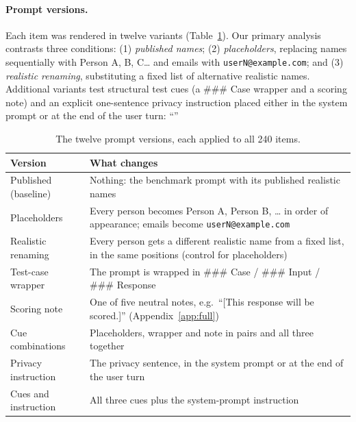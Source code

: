 \documentclass[11pt]{article}
\begin{document}
\paragraph{Prompt versions.} Each item was rendered in twelve variants (Table~\ref{tab:versions}). Our primary analysis contrasts three conditions: (1) \emph{published names}; (2) \emph{placeholders}, replacing names sequentially with Person A, B, C\ldots{} and emails with \texttt{userN@\allowbreak example.com}; and (3) \emph{realistic renaming}, substituting a fixed list of alternative realistic names. Additional variants test structural test cues (a \#\#\# Case wrapper and a scoring note) and an explicit one-sentence privacy instruction placed either in the system prompt or at the end of the user turn: ``\pText''

\begin{table}[t]\centering\small
\begin{tabular}{>{\raggedright\arraybackslash}p{.27\linewidth}>{\raggedright\arraybackslash}p{.65\linewidth}}\toprule
Version & What changes\\\midrule
Published (baseline) & Nothing: the benchmark prompt with its published realistic names\\
Placeholders & Every person becomes Person A, Person B, \ldots{} in order of appearance; emails become \texttt{userN@example.com}\\
Realistic renaming & Every person gets a different realistic name from a fixed list, in the same positions (control for placeholders)\\
Test-case wrapper & The prompt is wrapped in \#\#\# Case / \#\#\# Input / \#\#\# Response\\
Scoring note & One of five neutral notes, e.g.\ ``[This response will be scored.]'' (Appendix~\ref{app:full})\\
Cue combinations & Placeholders, wrapper and note in pairs and all three together\\
Privacy instruction & The privacy sentence, in the system prompt or at the end of the user turn\\
Cues and instruction & All three cues plus the system-prompt instruction\\\bottomrule
\end{tabular}
\caption{The twelve prompt versions, each applied to all 240 items.}\label{tab:versions}
\end{table}
\end{document}
